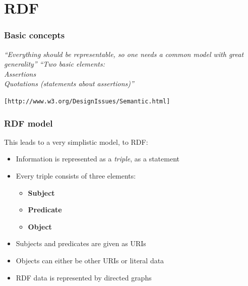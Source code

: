 \documentclass{beamer}
\begin{document}
    \section{RDF}

        \begin{frame}
            \frametitle{Basic concepts}

            \textit{``Everything should be representable, so one needs a common model with great generality''}
            \vskip 0.3cm
            \textit{``Two basic elements:\\
            Assertions\\
            Quotations (statements about assertions)''}
            \vskip 0.3cm
            \begin{flushright}
                \texttt{[http://www.w3.org/DesignIssues/Semantic.html]}
            \end{flushright}
        \end{frame}


        \begin{frame}
            \frametitle{RDF model}

            This leads to a very simplistic model, to RDF:
            \vskip 0.7cm
            \pause

            \begin{itemize}
                \item Information is represented as a \textit{triple}, as a statement
                \pause
                \item Every triple consists of three elements:
                \pause
                \begin{itemize}
                    \item \textbf{Subject}
                    \pause
                    \item \textbf{Predicate}
                    \pause
                    \item \textbf{Object}
                    \pause
               \end{itemize}
               \item Subjects and predicates are given as URIs
               \pause
               \item Objects can either be other URIs or literal data
               \pause
               \item RDF data is represented by directed graphs 
           \end{itemize}
        \end{frame}
\end{document}
